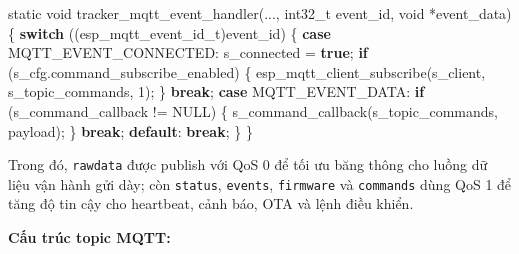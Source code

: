 \documentclass[a4paper]{extarticle}
\newenvironment{Shaded}{}{}
\newcommand{\ControlFlowTok}[1]{\textcolor[rgb]{0.00,0.44,0.13}{\textbf{#1}}}
\newcommand{\DataTypeTok}[1]{\textcolor[rgb]{0.56,0.13,0.00}{#1}}
\newcommand{\DecValTok}[1]{\textcolor[rgb]{0.25,0.63,0.44}{#1}}
\newcommand{\KeywordTok}[1]{\textcolor[rgb]{0.00,0.44,0.13}{\textbf{#1}}}
\newcommand{\NormalTok}[1]{#1}
\newcommand{\OperatorTok}[1]{\textcolor[rgb]{0.40,0.40,0.40}{#1}}
\begin{document}
\begin{Shaded}
\begin{Highlighting}[]
\DataTypeTok{static} \DataTypeTok{void}\NormalTok{ tracker\_mqtt\_event\_handler}\OperatorTok{(...,} \DataTypeTok{int32\_t}\NormalTok{ event\_id}\OperatorTok{,} \DataTypeTok{void} \OperatorTok{*}\NormalTok{event\_data}\OperatorTok{)} \OperatorTok{\{}
    \ControlFlowTok{switch} \OperatorTok{((}\NormalTok{esp\_mqtt\_event\_id\_t}\OperatorTok{)}\NormalTok{event\_id}\OperatorTok{)} \OperatorTok{\{}
        \ControlFlowTok{case}\NormalTok{ MQTT\_EVENT\_CONNECTED}\OperatorTok{:}
\NormalTok{            s\_connected }\OperatorTok{=} \KeywordTok{true}\OperatorTok{;}
            \ControlFlowTok{if} \OperatorTok{(}\NormalTok{s\_cfg}\OperatorTok{.}\NormalTok{command\_subscribe\_enabled}\OperatorTok{)} \OperatorTok{\{}
\NormalTok{                esp\_mqtt\_client\_subscribe}\OperatorTok{(}\NormalTok{s\_client}\OperatorTok{,}\NormalTok{ s\_topic\_commands}\OperatorTok{,} \DecValTok{1}\OperatorTok{);}
            \OperatorTok{\}}
            \ControlFlowTok{break}\OperatorTok{;}
        \ControlFlowTok{case}\NormalTok{ MQTT\_EVENT\_DATA}\OperatorTok{:}
            \ControlFlowTok{if} \OperatorTok{(}\NormalTok{s\_command\_callback }\OperatorTok{!=}\NormalTok{ NULL}\OperatorTok{)} \OperatorTok{\{}
\NormalTok{                s\_command\_callback}\OperatorTok{(}\NormalTok{s\_topic\_commands}\OperatorTok{,}\NormalTok{ payload}\OperatorTok{);}
            \OperatorTok{\}}
            \ControlFlowTok{break}\OperatorTok{;}
        \ControlFlowTok{default}\OperatorTok{:}
            \ControlFlowTok{break}\OperatorTok{;}
    \OperatorTok{\}}
\OperatorTok{\}}
\end{Highlighting}
\end{Shaded}

Trong đó, \texttt{rawdata} được publish với QoS 0 để tối ưu băng thông
cho luồng dữ liệu vận hành gửi dày; còn \texttt{status}, \texttt{events},
\texttt{firmware} và \texttt{commands} dùng QoS 1 để tăng độ tin cậy cho
heartbeat, cảnh báo, OTA và lệnh điều khiển.

\textbf{Cấu trúc topic MQTT:}
\end{document}
